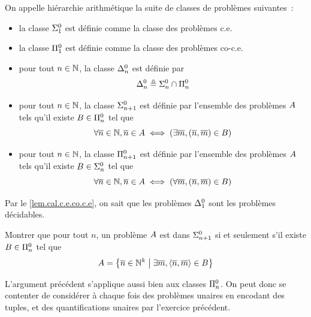 \begin{definition}\label{def.HA1}
  On appelle hiérarchie arithmétique la suite de classes de problèmes
  suivantes~:
  \begin{itemize}
  \item la classe $\Sigma^0_{1}$ est définie comme la classe des problèmes
    c.e.
  \item la classe $\Pi^0_{1}$ est définie comme la classe des problèmes
    co-c.e.
  \item pour tout $n \in \mathbb N$, la classe $\Delta^0_{n}$ est définie par
    \[\Delta^0_{n} \triangleq \Sigma^0_{n} \cap \Pi^0_{n}\]
  \item pour tout $n \in \mathbb N$, la classe $\Sigma^0_{n+1}$ est définie par
    l'ensemble des problèmes $A$ tels qu'il existe
    $B \in \Pi^0_{n}$ tel que
    \[\forall\overline{n} \in \mathbb N, \overline{n} \in A \iff
    (\exists \overline{m}, (\overline{n},\overline{m}) \in B)\]
  \item pour tout $n \in \mathbb N$, la classe $\Pi^0_{n+1}$ est définie par
    l'ensemble des problèmes $A$ tels qu'il existe
    $B \in \Sigma^0_{n}$ tel que
    \[\forall \overline{n} \in \mathbb N, \overline{n} \in A \iff
    (\forall \overline{m}, (\overline{n},\overline{m}) \in B)\]
  \end{itemize}
\end{definition}

\begin{remark}
  Par le \cref{lem.cal.c.e.co.c.e}, on sait que les problèmes $\Delta^0_{1}$
  sont les problèmes décidables.
\end{remark}

\begin{exercise}
  Montrer que pour tout $n$, un problème $A$ est dans $\Sigma^0_{n+1}$ si
  et seulement s'il existe $B \in \Pi^0_{n}$ tel que
  \[A =
  \left\{ \overline{n} \in \mathbb N^k \;\middle\vert\; \exists \overline{m}, \langle \overline{n},\overline{m}\rangle\in B \right\}\]
\end{exercise}

\begin{remark}
  L'argument précédent s'applique aussi bien aux classes $\Pi^0_{n}$.
  On peut donc se contenter de considérer à chaque fois des problèmes unaires
  en encodant des tuples, et des quantifications unaires par l'exercice
  précédent.
\end{remark}

